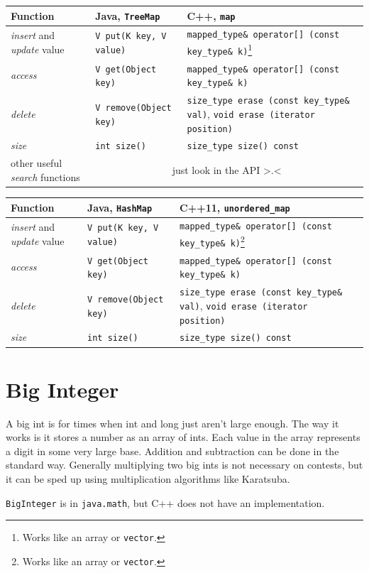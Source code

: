 \begin{center}
    \begin{tabular}{ p{5cm} p{5cm} p{5cm} }
	Function	&	Java, \texttt{TreeMap}	&	C++, \texttt{map} \\
	\hline
	\textit{insert} and \textit{update}	value	&	\texttt{V put(K key, V value)}	&	\texttt{mapped\_type\& operator[] (const key\_type\& k)}\footnote{Works like an array or \texttt{vector}.} \\
	\textit{access} & \texttt{V get(Object key)} & \texttt{mapped\_type\& operator[] (const key\_type\& k)} \\
    \textit{delete} & \texttt{V remove(Object key)} &	\texttt{size\_type erase (const key\_type\& val)}, \texttt{void erase (iterator position)} \\
    \textit{size} & \texttt{int size()} & \texttt{size\_type size() const} \\
    other useful \textit{search} functions	& \multicolumn{2}{c}{just look in the API >.<}
    \end{tabular}
\end{center}

\begin{center}
    \begin{tabular}{ p{5cm} p{5cm} p{5cm} }
	Function	&	Java, \texttt{HashMap}	&	C++11, \texttt{unordered\_map} \\
	\hline
	\textit{insert} and \textit{update}	value	&	\texttt{V put(K key, V value)}	&	\texttt{mapped\_type\& operator[] (const key\_type\& k)}\footnote{Works like an array or \texttt{vector}.} \\
	\textit{access} & \texttt{V get(Object key)} & \texttt{mapped\_type\& operator[] (const key\_type\& k)} \\
    \textit{delete} & \texttt{V remove(Object key)} &	\texttt{size\_type erase (const key\_type\& val)}, \texttt{void erase (iterator position)} \\
    \textit{size} & \texttt{int size()} & \texttt{size\_type size() const}
    \end{tabular}
\end{center}

\section{Big Integer}

A big int is for times when int and long just aren't large enough. The way it works is it stores a number as an array of ints. Each value in the array represents a digit in some very large base. Addition and subtraction can be done in the standard way. Generally multiplying two big ints is not necessary on contests, but it can be sped up using multiplication algorithms like Karatsuba.

\texttt{BigInteger} is in \texttt{java.math}, but C++ does not have an implementation.
